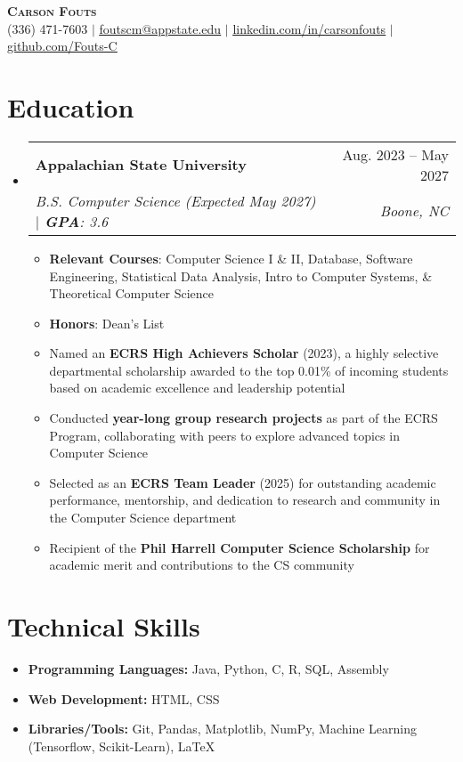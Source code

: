 \documentclass[letterpaper,11pt]{article}
\makeatletter
\newcommand{\resumeItem}[1]{
  \item\small{
    {#1 \vspace{-2pt}}
  }
}
\newcommand{\resumeSubheading}[4]{
  \vspace{-2pt}\item
    \begin{tabular*}{0.97\textwidth}[t]{l@{\extracolsep{\fill}}r}
      \textbf{#1} & #2 \\
      \textit{\small#3} & \textit{\small #4} \\
    \end{tabular*}\vspace{-7pt}
}
\newcommand{\resumeSubHeadingListStart}{\begin{itemize}[leftmargin=0.15in, label={}]}
\newcommand{\resumeSubHeadingListEnd}{\end{itemize}}
\newcommand{\resumeItemListStart}{\begin{itemize}}
\newcommand{\resumeItemListEnd}{\end{itemize}\vspace{-5pt}}
\makeatother
\begin{document}
\begin{center}
    \textbf{\Huge \scshape Carson Fouts} \\ \vspace{1pt}
    \small (336) 471-7603 $|$ \href{mailto:foutscm@appstate.edu}{\underline{foutscm@appstate.edu}} $|$ 
    \href{https://linkedin.com/in/carsonfouts}{\underline{linkedin.com/in/carsonfouts}}
    $|$ 
    \href{https://github.com/Fouts-C}{\underline{github.com/Fouts-C}}
\end{center}

\section{Education}
  \resumeSubHeadingListStart
    \resumeSubheading
      {Appalachian State University}{Aug. 2023 -- May 2027}
      {B.S. Computer Science (Expected May 2027) $|$ \textbf{GPA}: 3.6}
      {Boone, NC}
      \resumeItemListStart
        \resumeItem{\textbf{Relevant Courses}: Computer Science I \& II, Database, Software Engineering, Statistical Data Analysis, Intro to Computer Systems, \& Theoretical Computer Science}
        \resumeItem{\textbf{Honors}: Dean's List}
        \resumeItem{Named an \textbf{ECRS High Achievers Scholar} (2023), a highly selective departmental scholarship awarded to the top 0.01\% of incoming students based on academic excellence and leadership potential}
        \resumeItem{Conducted \textbf{year-long group research projects} as part of the ECRS Program, collaborating with peers to explore advanced topics in Computer Science}
        \resumeItem{Selected as an \textbf{ECRS Team Leader} (2025) for outstanding academic performance, mentorship, and dedication to research and community in the Computer Science department}
        \resumeItem{Recipient of the \textbf{Phil Harrell Computer Science Scholarship} for academic merit and contributions to the CS community}
        
      \resumeItemListEnd
  \resumeSubHeadingListEnd
  
\section{Technical Skills}
\begin{itemize}[leftmargin=0.15in, label={}]
    \item[] \textbf{Programming Languages:} Java, Python, C, R, SQL, Assembly
    \item[] \textbf{Web Development:} HTML, CSS
    \item[] \textbf{Libraries/Tools:} Git, Pandas, Matplotlib, NumPy, Machine Learning (Tensorflow, Scikit-Learn), LaTeX
\end{itemize}
 
\end{document}
